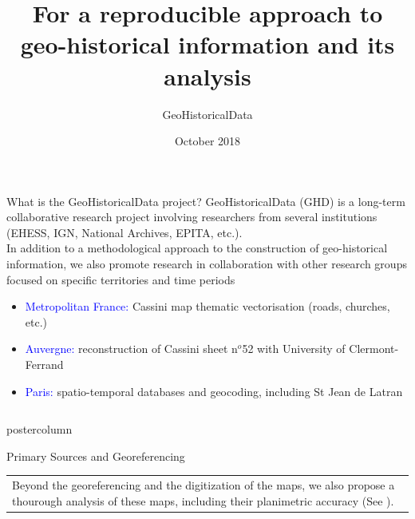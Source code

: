 \documentclass[final,hyperref={pdfpagelabels=false}]{beamer}
\title{For a reproducible approach to geo-historical information and its analysis}
\author{GeoHistoricalData}
\institute{~}
\date{October 2018}
\let\oldcite=\cite
\renewcommand{\cite}[1]{\textcolor{ta3chameleon}{\oldcite{#1}}}
\begin{document}
\begin{frame}
  \begin{block}{What is the GeoHistoricalData project?}
    \textcolor{ta3orange}{GeoHistoricalData} (GHD) is a long-term collaborative research project involving researchers from several institutions (EHESS, IGN, National Archives, EPITA, etc.).\\
    In addition to a methodological approach to the construction of geo-historical information, we also promote research in collaboration with other research groups focused on specific territories and time periods
    \begin{itemize}
    \item \textcolor{blue}{Metropolitan France:} Cassini map thematic vectorisation (roads, churches, etc.)
    \item \textcolor{blue}{Auvergne:} \textcolor{ta3orange}{reconstruction of Cassini sheet n$^{o}$52} with University of Clermont-Ferrand
    \item \textcolor{blue}{Paris:} spatio-temporal databases and geocoding, including \textcolor{ta3orange}{St Jean de Latran}~\cite{Rebolledo-Dhuin2014}
    \end{itemize}
  \end{block}
  \begin{columns}
    \begin{column}{0.5\textwidth}
    \begin{beamercolorbox}[center,wd=\textwidth]{postercolumn}
    \begin{minipage}[t]{.98\textwidth}
    \renewcommand{\footnoterule}{}
    \begin{block}{Primary Sources and Georeferencing}
      \begin{tabular}{p{}p{}}
        \multicolumn{2}{p{0.9\textwidth}}{Beyond the georeferencing and the digitization of the maps, we also propose a thourough analysis of these maps, including their planimetric accuracy (See \cite{Dumenieu2013a,Dumenieu2015PhD,Dumenieu2018}).}\\

\end{tabular}
\end{block}
\end{minipage}
\end{beamercolorbox}
\end{column}
\end{columns}
\end{frame}
\end{document}
